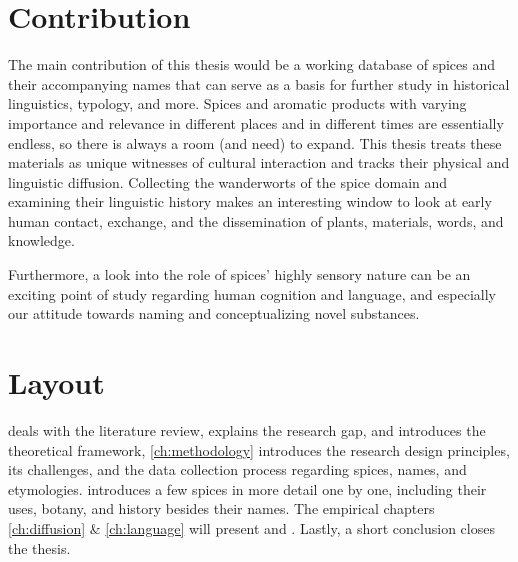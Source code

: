 \section{Contribution}

The main contribution of this thesis would be a working database of spices and their accompanying names that can serve as a basis for further study in historical linguistics, typology, and more. Spices and aromatic products with varying importance and relevance in different places and in different times are essentially endless, so there is always a room (and need) to expand. This thesis treats these materials as unique witnesses of cultural interaction and tracks their physical and linguistic diffusion. Collecting the \glspl{wanderwort} of the spice domain and examining their linguistic history makes an interesting window to look at early human contact, exchange, and the dissemination of plants, materials, words, and knowledge.

Furthermore, a look into the role of spices' highly sensory nature can be an exciting point of study regarding human cognition and language, and especially our attitude towards naming and conceptualizing novel substances.





\section{Layout}

  deals with the literature review, explains the research gap, and introduces the theoretical framework, \cref{ch:methodology}  introduces the research design principles, its challenges, and the data collection process regarding spices, names, and etymologies.   introduces a few spices in more detail one by one, including their uses, botany, and history besides their names. The empirical chapters \cref{ch:diffusion} \& \cref{ch:language} will present  and . Lastly, a short conclusion closes the thesis.










